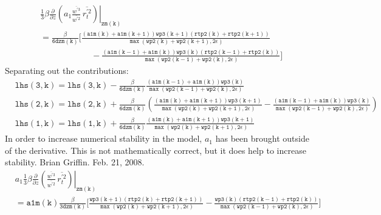 \documentclass[11pt,fleqn]{article}
\newcommand{\ptlder}[2]{\frac{\partial #1}{\partial #2}}
\begin{document}
\begin{equation}
\begin{split}
& \left.
  \frac{1}{3} \beta
   \ptlder{}{z}
     \left( 
       a_1
       \frac{\overline{w^{'3}}}{\overline{w^{'2}}} \,
       \overline{r_t^{'2}}
     \right)
   \right|_{\mathtt{zm(k)}} \\
&= \mathtt{
    \frac{\beta}{6 dzm(k)}
    \bigg[ \frac{\left(a1m(k)+a1m(k+1)\right) wp3(k+1) \left(rtp2(k)+rtp2(k+1) \right)}
                {\max\left(wp2(k)+wp2(k+1),2\epsilon\right)} } \\
&  \mathtt{ \quad \quad \quad \quad \quad \quad
          -\frac{\left(a1m(k-1)+a1m(k)\right) wp3(k) \left(rtp2(k-1)+rtp2(k) \right)}
                {\max\left(wp2(k-1)+wp2(k),2\epsilon\right)}
    \bigg]
    }
\end{split}
\end{equation}
%
Separating out the contributions:
%
\begin{equation}
\begin{split}
& \mathtt{ 
   lhs(3,k) = lhs(3,k) - \frac{\beta}{6 dzm(k)}
                 \frac{\left(a1m(k-1)+a1m(k)\right) wp3(k)}
                      {\max\left(wp2(k-1)+wp2(k),2\epsilon\right)}
  } \\
& \mathtt{
   lhs(2,k) = lhs(2,k) + \frac{\beta}{6 dzm(k)}
                 \left(
                   \frac{\left(a1m(k)+a1m(k+1)\right) wp3(k+1)}
                        {\max\left(wp2(k)+wp2(k+1),2\epsilon\right)}
                  -\frac{\left(a1m(k-1)+a1m(k)\right) wp3(k)}
                        {\max\left(wp2(k-1)+wp2(k),2\epsilon\right)}
                 \right)
  } \\
& \mathtt{
   lhs(1,k) = lhs(1,k) + \frac{\beta}{6 dzm(k)}
                 \frac{\left(a1m(k)+a1m(k+1)\right) wp3(k+1)}
                      {\max\left(wp2(k)+wp2(k+1),2\epsilon\right)}
  }
\end{split}
\end{equation}
%
In order to increase numerical stability in the model, $a_{1}$ has been brought
outside of the derivative.  This is not mathematically correct, but it does 
help to increase stability.  Brian Griffin.  Feb. 21, 2008.
% 
\begin{equation}
\begin{split}
& \left.
  a_1
  \frac{1}{3} \beta
   \ptlder{}{z}
     \left( 
       \frac{\overline{w^{'3}}}{\overline{w^{'2}}} \,
       \overline{r_t^{'2}}
     \right)
   \right|_{\mathtt{zm(k)}} \\
&= \mathtt{
    a1m(k)
    \frac{\beta}{3 dzm(k)}
    \bigg[ \frac{wp3(k+1) \left(rtp2(k)+rtp2(k+1) \right)}
                {\max\left(wp2(k)+wp2(k+1),2\epsilon\right)}
          -\frac{wp3(k) \left(rtp2(k-1)+rtp2(k) \right)}
                {\max\left(wp2(k-1)+wp2(k),2\epsilon\right)}
    \bigg]
    }
\end{split}
\end{equation}
\end{document}
